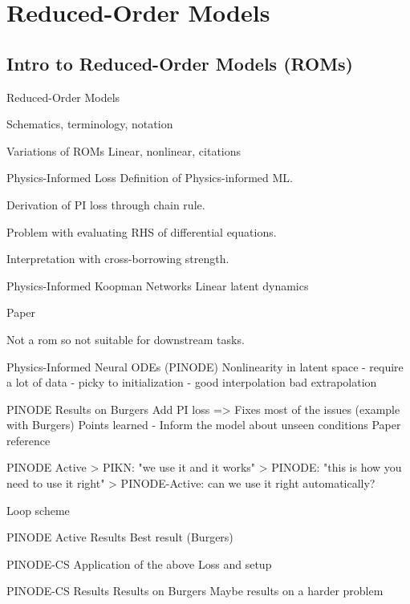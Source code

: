 \section{Reduced-Order Models}
\subsection{Intro to Reduced-Order Models (ROMs)}

\begin{frame}{Reduced-Order Models}

Schematics, terminology, notation

\end{frame}

\begin{frame}{Variations of ROMs}
	Linear, nonlinear, citations
\end{frame}


\begin{frame}{Physics-Informed Loss}
Definition of Physics-informed ML.

Derivation of PI loss through chain rule. 

Problem with evaluating RHS of differential equations.

Interpretation with cross-borrowing strength. 
\end{frame}

\begin{frame}{Physics-Informed Koopman Networks}
	Linear latent dynamics
	
	Paper
	
	Not a rom so not suitable for downstream tasks. 
\end{frame}

\begin{frame}{Physics-Informed Neural ODEs (PINODE)}
	Nonlinearity in latent space
	- require a lot of data
	- picky to initialization
	- good interpolation bad extrapolation	
\end{frame}

\begin{frame}{PINODE Results on Burgers}
	Add PI loss => Fixes most of the issues
	(example with Burgers)
	Points learned
	- Inform the model about unseen conditions
	Paper reference
\end{frame}

\begin{frame}{PINODE Active}
	> PIKN: "we use it and it works"
	> PINODE: "this is how you need to use it right"
	> PINODE-Active: can we use it right automatically?
	
	Loop scheme
\end{frame}

\begin{frame}{PINODE Active Results}
	Best result (Burgers)
\end{frame}

\begin{frame}{PINODE-CS}
	Application of the above 
	Loss and setup
\end{frame}

\begin{frame}{PINODE-CS Results}
	Results on Burgers
	Maybe results on a harder problem
\end{frame}
